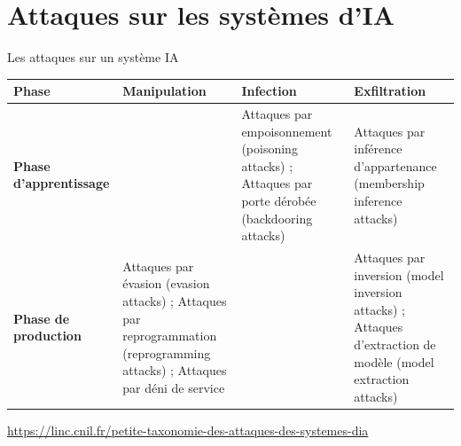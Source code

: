 \documentclass[aspectratio=169, 10pt, table]{beamer}
\begin{document}
\section{Attaques sur les systèmes d'IA}

\begin{frame}{Les attaques sur un système IA}
    \centering
    \begin{table}
        \renewcommand{\arraystretch}{1.4}
        \small
        \begin{tabularx}{\textwidth}{>{\bfseries}l >{\raggedright\arraybackslash}X >{\raggedright\arraybackslash}X >{\raggedright\arraybackslash}X}
            \toprule
            \rowcolor{TSPblue}\color{white}\textbf{\footnotesize Phase} & \color{white}\textbf{\footnotesize Manipulation} & \color{white}\textbf{\footnotesize Infection} & \color{white}\textbf{\footnotesize Exfiltration} \\
            \midrule
            Phase d'apprentissage & & Attaques par empoisonnement (poisoning attacks) ; Attaques par porte dérobée (backdooring attacks) & Attaques par inférence d'appartenance (membership inference attacks) \\
            \midrule
            Phase de production & Attaques par évasion (evasion attacks) ; Attaques par reprogrammation (reprogramming attacks) ; Attaques par déni de service & & Attaques par inversion (model inversion attacks) ; Attaques d'extraction de modèle (model extraction attacks) \\
            \bottomrule
        \end{tabularx}
    \end{table}
    \vspace{0.2cm}
    {\footnotesize\url{https://linc.cnil.fr/petite-taxonomie-des-attaques-des-systemes-dia}}
\end{frame}
\end{document}
